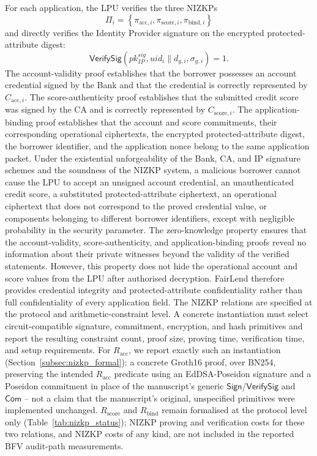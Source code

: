\documentclass[a4paper,fleqn]{cas-dc}
\begin{document}
{For each application, the LPU verifies the three NIZKPs \[ \Pi_i = \left\{ \pi_{\mathrm{acc},i}, \pi_{\mathrm{score},i}, \pi_{\mathrm{bind},i} \right\} \] and directly verifies the Identity Provider signature on the encrypted protected-attribute digest: \[ \mathsf{VerifySig} \left( pk_{IP}^{sig}, uid_i\parallel d_{g,i}, \sigma_{g,i} \right) =1. \] The account-validity proof establishes that the borrower possesses an account credential signed by the Bank and that the credential is correctly represented by $C_{\mathrm{acc},i}$. The score-authenticity proof establishes that the submitted credit score was signed by the CA and is correctly represented by $C_{\mathrm{score},i}$. The application-binding proof establishes that the account and score commitments, their corresponding operational ciphertexts, the encrypted protected-attribute digest, the borrower identifier, and the application nonce belong to the same application packet. Under the existential unforgeability of the Bank, CA, and IP signature schemes and the soundness of the NIZKP system, a malicious borrower cannot cause the LPU to accept an unsigned account credential, an unauthenticated credit score, a substituted protected-attribute ciphertext, an operational ciphertext that does not correspond to the proved credential value, or components belonging to different borrower identifiers, except with negligible probability in the security parameter. The zero-knowledge property ensures that the account-validity, score-authenticity, and application-binding proofs reveal no information about their private witnesses beyond the validity of the verified statements. However, this property does not hide the operational account and score values from the LPU after authorised decryption. FairLend therefore provides credential integrity and protected-attribute confidentiality rather than full confidentiality of every application field. The NIZKP relations are specified at the protocol and arithmetic-constraint level. A concrete instantiation must select circuit-compatible signature, commitment, encryption, and hash primitives and report the resulting constraint count, proof size, proving time, verification time, and setup requirements. For $R_{\mathrm{acc}}$, we report exactly such an instantiation (Section~\ref{subsec:nizkp_formal}): a concrete Groth16 proof, over BN254, preserving the intended $R_{\mathrm{acc}}$ predicate using an EdDSA-Poseidon signature and a Poseidon commitment in place of the manuscript's generic $\mathsf{Sign}$/$\mathsf{VerifySig}$ and $\mathsf{Com}$ -- not a claim that the manuscript's original, unspecified primitives were implemented unchanged. $R_{\mathrm{score}}$ and $R_{\mathrm{bind}}$ remain formalised at the protocol level only (Table~\ref{tab:nizkp_status}); NIZKP proving and verification costs for these two relations, and NIZKP costs of any kind, are not included in the reported BFV audit-path measurements.

}
\end{document}
